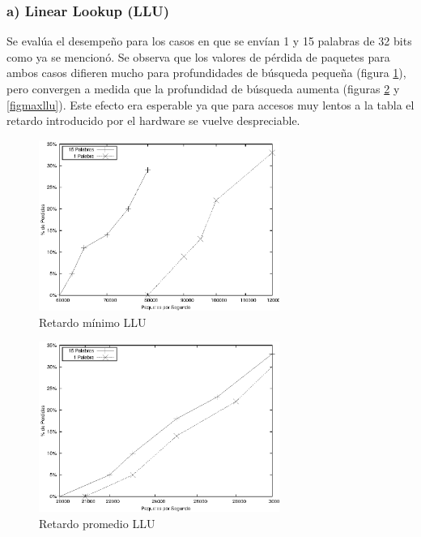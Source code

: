 \subsubsection{a) Linear Lookup (LLU)}
Se evalúa el desempeño para los casos en que se envían 1 y 15 palabras de 32 bits como ya se mencionó. Se observa que los valores de pérdida de paquetes para ambos casos difieren mucho para profundidades de búsqueda pequeña (figura \ref{figminllu}), pero convergen a medida que la profundidad de búsqueda aumenta (figuras \ref{figpromllu} y \ref{figmaxllu}). Este efecto era esperable ya que para accesos muy lentos a la tabla el retardo introducido por el hardware se vuelve despreciable.

\begin{figure}[!h]
  \centering
	\includegraphics[width=0.7\textwidth]{5-resultados/graf/llumin.eps}
  \caption{Retardo mínimo LLU}
  \label{figminllu}
\end{figure}
\begin{figure}[!h]
  \centering
	\includegraphics[width=0.7\textwidth]{5-resultados/graf/lluprom.eps}
  \caption{Retardo promedio LLU}
  \label{figpromllu}
\newpage
\end{figure}
